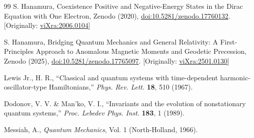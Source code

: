 \documentclass[%
 reprint,
 amsmath,amssymb,
 aps,
]{revtex4-1}
\numberwithin{equation}{section}%
\begin{document}
\begin{thebibliography}{99}
S. Hanamura, Coexistence Positive and Negative-Energy States in the Dirac Equation with One Electron, Zenodo (2020), \href{https://doi.org/10.5281/zenodo.17760132}{doi:10.5281/zenodo.17760132}. [Originally: \href{https://vixra.org/abs/2006.0104}{viXra:2006.0104}]

S. Hanamura, Bridging Quantum Mechanics and General Relativity: A First-Principles Approach to Anomalous Magnetic Moments and Geodetic Precession, Zenodo (2025), \href{https://doi.org/10.5281/zenodo.17765097}{doi:10.5281/zenodo.17765097}. [Originally: \href{https://vixra.org/abs/2501.0130}{viXra:2501.0130}]

 Lewis Jr., H. R.,
``Classical and quantum systems with time-dependent harmonic-oscillator-type Hamiltonians,''
\textit{Phys. Rev. Lett.} \textbf{18}, 510 (1967).

 Dodonov, V. V. \& Man'ko, V. I.,
``Invariants and the evolution of nonstationary quantum systems,''
\textit{Proc. Lebedev Phys. Inst.} \textbf{183}, 1 (1989).

 Messiah, A.,
\textit{Quantum Mechanics}, Vol. 1 (North-Holland, 1966).

\end{thebibliography}
\end{document}
